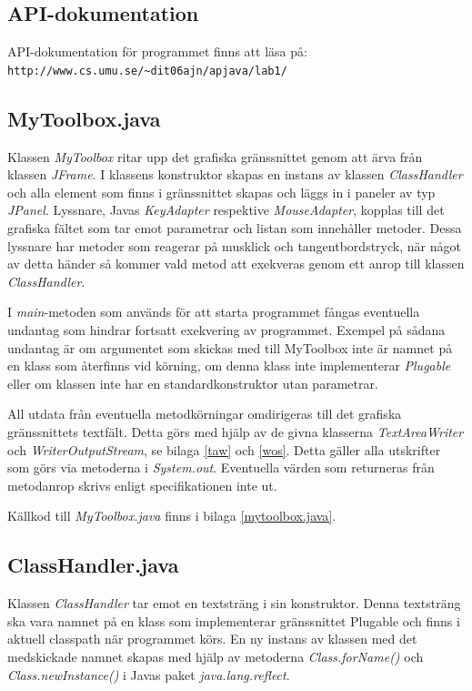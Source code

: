 \documentclass[a4paper, 12pt]{article}
\begin{document}
\subsection{API-dokumentation}
API-dokumentation för programmet finns att läsa på:\\
\verb!http://www.cs.umu.se/~dit06ajn/apjava/lab1/!

\subsection{MyToolbox.java}
Klassen \textit{MyToolbox} ritar upp det grafiska gränssnittet genom
att ärva från klassen \textit{JFrame}. I klassens konstruktor skapas
en instans av klassen \textit{ClassHandler} och alla element som finns
i gränssnittet skapas och läggs in i paneler av typ
\textit{JPanel}. Lyssnare, Javas \textit{KeyAdapter} respektive
\textit{MouseAdapter}, kopplas till det grafiska fältet som tar emot
parametrar och listan som innehåller metoder. Dessa lyssnare har
metoder som reagerar på musklick och tangentbordstryck, när något av
detta händer så kommer vald metod att exekveras genom ett anrop till
klassen \textit{ClassHandler}.

I \textit{main}-metoden som används för att starta programmet fångas
eventuella undantag som hindrar fortsatt exekvering av
programmet. Exempel på sådana undantag är om argumentet som skickas
med till MyToolbox inte är namnet på en klass som återfinns vid
körning, om denna klass inte implementerar \textit{Plugable} eller om
klassen inte har en standardkonstruktor utan parametrar.

All utdata från eventuella metodkörningar omdirigeras till det
grafiska gräns\-snittets textfält. Detta görs med hjälp av de givna
klasserna \textit{TextAreaWriter} och \textit{WriterOutputStream}, se
bilaga \ref{taw} och \ref{wos}. Detta gäller alla utskrifter som görs
via metoderna i \textit{System.out}. Eventuella värden som returneras
från metodanrop skrivs enligt specifikationen inte ut.

Källkod till \textit{MyToolbox.java} finns i bilaga
\ref{mytoolbox.java}.

\subsection{ClassHandler.java}
Klassen \textit{ClassHandler} tar emot en textsträng i sin
konstruktor. Denna textsträng ska vara namnet på en klass som
implementerar gränssnittet Plugable och finns i aktuell classpath när
programmet körs. En ny instans av klassen med det medskickade namnet
skapas med hjälp av metoderna \textit{Class.forName()} och
\textit{Class.newInstance()} i Javas paket \textit{java.lang.reflect}.
\end{document}
